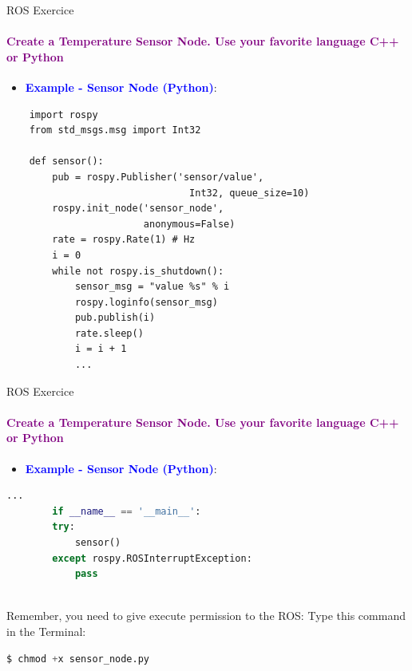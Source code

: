 \documentclass[aspectratio=169]{beamer}
\begin{document}
\begin{frame}[t,fragile]{ROS Exercice}
	\framesubtitle{\textcolor{purple}{Create a Temperature Sensor Node. Use your favorite language C++ or Python}}
	\begin{minipage}{0.6\textwidth}
		\begin{itemize}
			\item \textcolor{blue}{\textbf{Example - Sensor Node (Python)}}:
		\end{itemize}
	\begin{lstlisting}
	import rospy
	from std_msgs.msg import Int32

	def sensor():
		pub = rospy.Publisher('sensor/value', 
								Int32, queue_size=10)
		rospy.init_node('sensor_node',
						anonymous=False)
		rate = rospy.Rate(1) # Hz
		i = 0
		while not rospy.is_shutdown():
			sensor_msg = "value %s" % i
			rospy.loginfo(sensor_msg)
			pub.publish(i)
			rate.sleep()
			i = i + 1
			...
    \end{lstlisting}
\end{minipage}
\begin{minipage}{0.4\textwidth}
	
\end{minipage}
\end{frame}


\begin{frame}[fragile]{ROS Exercice}
	\framesubtitle{\textcolor{purple}{Create a Temperature Sensor Node. Use your favorite language C++ or Python}}
	\begin{minipage}{0.6\textwidth}
	\begin{itemize}
		\item \textcolor{blue}{\textbf{Example - Sensor Node (Python)}}:
	\end{itemize}
	\begin{lstlisting}[language=Python]
		...
		if __name__ == '__main__':
		try:
			sensor()
		except rospy.ROSInterruptException:
			pass
	
    \end{lstlisting}
	\begin{block}{Remember, you need to give execute permission to the ROS:}
		Type this command in the Terminal:
		\begin{lstlisting}[language=Python]
		$ chmod +x sensor_node.py
		\end{lstlisting}
	\end{block}
\end{minipage}
\begin{minipage}{0.4\textwidth}
	
\end{minipage}
\end{frame}
\end{document}
